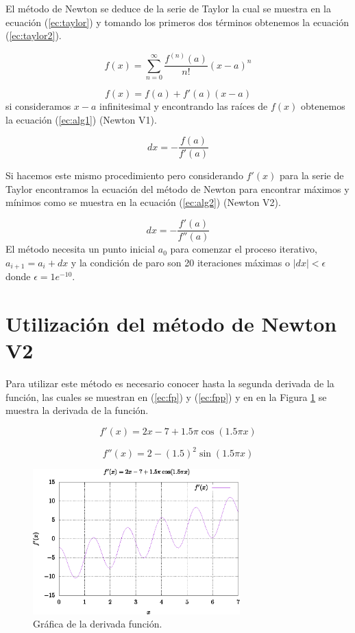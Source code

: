 \documentclass[conference]{IEEEtran}
\begin{document}
El método de Newton se deduce de la serie de Taylor la cual se muestra en la ecuación (\ref{ec:taylor}) y tomando los primeros dos términos obtenemos la ecuación (\ref{ec:taylor2}).

\begin{equation}
f(x) = \sum_{n=0}^{\infty} \frac{f^{(n)} (a)}{n !} (x -a)^{n}
\label{ec:taylor}
\end{equation}

\begin{equation}
f(x) = f(a) + f'(a) (x-a)
\label{ec:taylor2}
\end{equation}
si consideramos $x-a$ infinitesimal y encontrando las raíces de $f(x)$ obtenemos la ecuación (\ref{ec:alg1}) (Newton V1).

\begin{equation}
dx = - \frac{f(a)}{f'(a)}
\label{ec:alg1}
\end{equation}

Si hacemos este mismo procedimiento pero considerando $f'(x)$ para la serie de Taylor encontramos la ecuación del método de Newton para encontrar máximos y mínimos como se muestra en la ecuación (\ref{ec:alg2}) (Newton V2).

\begin{equation}
dx = - \frac{f'(a)}{f''(a)}
\label{ec:alg2}
\end{equation}
El método necesita un punto inicial $a_{0}$ para comenzar el proceso iterativo, $a_{i+1} = a_{i} + dx$ y la condición de paro son 20 iteraciones máximas o $|dx| < \epsilon$ donde $\epsilon =  1e^{-10}$.

\section{Utilización del método de Newton V2}

Para utilizar este método es necesario conocer hasta la segunda derivada de la función, las cuales se muestran en (\ref{ec:fp}) y (\ref{ec:fpp}) y en en la Figura \ref{fig:fp} se muestra la derivada de la función.

\begin{equation}
f'(x) = 2x -7 + 1.5 \pi \cos(1.5 \pi x)
\label{ec:fp}
\end{equation}

\begin{equation}
f''(x) = 2 -(1.5)^{2} \sin(1.5 \pi x)
\label{ec:fpp}
\end{equation}

\begin{figure}[hbtp]
\centering
\includegraphics[width=8cm]{grafica2.eps} 
\caption{Gráfica de la derivada función.}
\label{fig:fp}
\end{figure}
\end{document}
